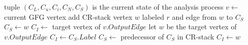\begin{algorithmic}
	
	\State tuple $(C_L, C_u, C_i, C_N, C_S)$ is the current state of the analysis process
	\State $v \gets$ current GFG vertex
					\State {}
				\EndFor
			\EndCase
				\State add CR-stack vertex $w$ labeled $r$ and edge from $w$ to $C_S$
				\State $C_S \gets w$
				\State $C_I \gets$ target vertex of $v.OutputEdge$
				\State {}
			\EndCase
				\State let $w$ be the target vertex of $v.OutputEdge$
					\State $C_I \gets C_S.Label$
					\State $C_S \gets$ predecessor of $C_S$ in CR-stack
					\State {}
				\Else
					\State $C_I \gets w$
				\EndIf
			\EndCase
			\Case{\_}
				\ \Return
			\EndCase
		\EndSwitch
	\EndIf
\EndProcedure
\end{algorithmic}